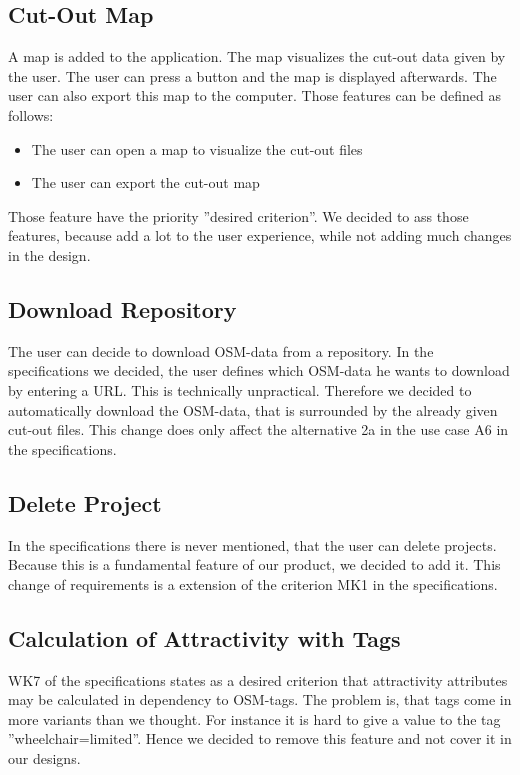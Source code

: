 \documentclass[parskip=full]{scrartcl} %
\begin{document}
\subsection*{Cut-Out Map}
A map is added to the application. The map visualizes the cut-out data given by the user. The user can press a button and the map is displayed afterwards. The user can also export this map to the computer. Those features can be defined as follows:
\begin{itemize}
    \item <WK9> The user can open a map to visualize the cut-out files
    \item <WK10> The user can export the cut-out map
\end{itemize}
Those feature have the priority ''desired criterion''. We decided to ass those features, because add a lot to the user experience, while not adding much changes in the design.

\subsection*{Download Repository}
The user can decide to download OSM-data from a repository. In the specifications we decided, the user defines which OSM-data he wants to download by entering a URL. This is technically unpractical. Therefore we decided to automatically download the OSM-data, that is surrounded by the already given cut-out files. This change does only affect the alternative 2a in the use case A6 in the specifications.

\subsection*{Delete Project}
In the specifications there is never mentioned, that the user can delete projects. Because this is a fundamental feature of our product, we decided to add it. This change of requirements is a extension of the criterion MK1 in the specifications.

\subsection*{Calculation of Attractivity with Tags}
WK7 of the specifications states as a desired criterion that attractivity attributes may be calculated in dependency to OSM-tags. The problem is, that tags come in more variants than we thought. For instance it is hard to give a value to the tag ''wheelchair=limited''. Hence we decided to remove this feature and not cover it in our designs.
\end{document}
